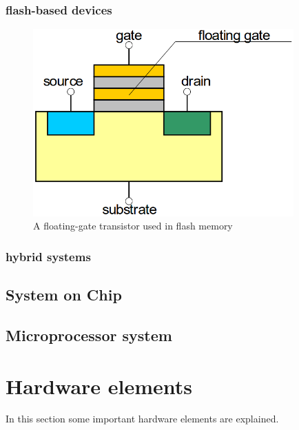 \subsubsection{flash-based devices}
\begin{figure}[htbp]
\begin{center}
\includegraphics[width=10cm,keepaspectratio=true]{bilder/png/FlashTransistor}
\caption{A floating-gate transistor used in flash memory\cite{Core16}}
\label{fig:FlashTransistor}
\end{center}
\end{figure}
\subsubsection{hybrid systems}
\subsection{System on Chip}
\subsection{Microprocessor system}

\section{Hardware elements}
In this section some important hardware elements are explained.

